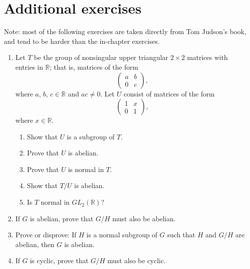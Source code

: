 { 
\section*{Additional exercises}
\exrule
 
{\small
Note: most of the following exercises are taken directly from Tom Judson's book, and tend to be harder than the in-chapter exercises.

\begin{enumerate}
 
 

 
\item
Let $T$ be the group of nonsingular upper triangular $2 \times 2$
matrices with entries in ${\mathbb R}$; that is, matrices of the form
\[
\begin{pmatrix}
a & b \\
0 & c
\end{pmatrix},
\]
where $a$, $b$, $c \in {\mathbb R}$ and $ac \neq 0$. Let $U$ consist of
matrices of the form 
\[
\begin{pmatrix}
1 & x \\
0 & 1
\end{pmatrix},
\]
where $x \in {\mathbb R}$.
\begin{enumerate}
 
 \item 
Show that $U$ is a subgroup of $T$.
 
 \item 
Prove that $U$ is abelian.
 
 \item 
Prove that $U$ is normal in $T$.
 
 \item  
Show that $T/U$ is abelian.
 
 \item
Is $T$ normal in $GL_2( {\mathbb R})$?
 
\end{enumerate}



\item
If $G$ is abelian, prove that $G/H$ must also be abelian.
 
\item
Prove or disprove: If $H$ is a normal subgroup of $G$ such that $H$
and $G/H$ are abelian, then $G$ is abelian. 
 
 

\item
If $G$ is cyclic, prove that $G/H$ must also be cyclic.



\end{enumerate}}}
